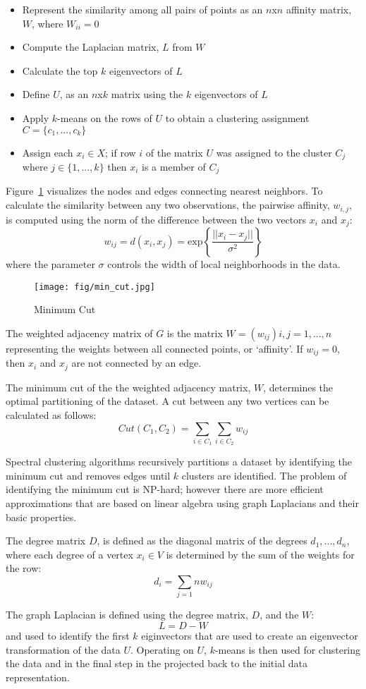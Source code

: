 \begin{itemize}
	\item Represent the similarity among all pairs of points as an $n$x$n$ affinity matrix, $W$, where $W_{ii}=0$
	\item Compute the Laplacian matrix, $L$ from $W$
	\item Calculate the top $k$ eigenvectors of $L$
	\item Define $U$, as an $n$x$k$ matrix using the $k$ eigenvectors of $L$
     \item Apply $k$-means on the rows of $U$ to obtain a clustering assignment $C=\{c_1,...,c_k\}$
     \item Assign each $x_i \in X$; if row $i$ of the matrix $U$ was assigned to the cluster $C_j$ where $j \in \{1,...,k\}$ then $x_i$ is a member of $C_j$
 \end{itemize}

Figure~\ref{min_cut} visualizes the nodes and edges connecting nearest neighbors.  To calculate the similarity between any two observations, the pairwise affinity, $w_{i,j}$, is computed using the norm of the difference between the two vectors $x_{i}$ and $x_{j}$:
$$w_{ij}=d(x_{i},x_{j})=\text{exp}\left\{\frac{||x_{i}-x_{j}||}{\sigma^{2}}\right\}$$
where the parameter $\sigma$ controls the width of local neighborhoods in the data.

\begin{figure}[h]
\centering
\texttt{[image: fig/min\_cut.jpg]}
\caption{Minimum Cut}
\label{min_cut}
\end{figure}

The weighted adjacency matrix of $G$ is the matrix $W = (w_{ij})i,j=1,...,n$ representing the weights between all connected points, or `affinity'. If $w_{ij} = 0$, then $x_{i}$ and $x_{j}$ are not connected by an edge.

The minimum cut of the the weighted adjacency matrix, $W$, determines the optimal partitioning of the dataset.  A cut between any two vertices can be calculated as follows:
$$Cut(C_{1},C_{2})=\sum_{i\in C_{1}}\sum_{i\in C_{2}}w_{ij}$$

Spectral clustering algorithms recursively partitions a dataset by identifying the minimum cut and removes edges until $k$ clusters are identified. The problem of identifying the minimum cut is NP-hard; however there are more efficient approximations that are based on linear algebra using graph Laplacians and their basic properties.

The degree matrix $D$, is defined as the diagonal matrix of the degrees $d_{1},...,d_{n}$, where each degree of a vertex $x_{i} \in V$ is determined by the sum of the weights for the row:
$$d_{i}=\sum_{j=1}{n}w_{ij}$$

The graph Laplacian is defined using the degree matrix, $D$, and the $W$:
$$L=D-W$$
\noindent and used to identify the first $k$ eiginvectors that are used to create an eigenvector transformation of the data $U$.  Operating on $U$, $k$-means is then used for clustering the data and in the final step in the projected back to the initial data representation.
